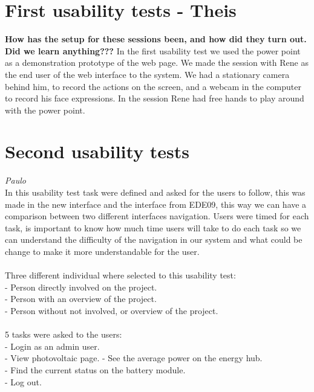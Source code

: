 \section{First usability tests - Theis}
\textbf{How has the setup for these sessions been, and how did they turn out. Did we learn anything???}
In the first usability test we used the power point as a demonstration prototype of the web page. We made the session with Rene as the end user of the web interface to the system. We had a stationary camera behind him, to record the actions on the screen, and a webcam in the computer to record his face expressions. In the session Rene had free hands to play around with the power point.


\section{Second usability tests}
\textit{Paulo}\\
In this usability test task were defined and asked for the users to follow, this was made in the new interface and the interface from EDE09, this way we can have a comparison between two different interfaces navigation. Users were timed for each task, is important to know how much time users will take to do each task so we can understand the difficulty of the navigation in our system and what could be change to make it more understandable for the user.
\\
\\Three different individual where selected to this usability test:\\
- Person directly involved on the project.\\
- Person with an overview of the project.\\
- Person without not involved, or overview of the project.\\
\\
5 tasks were asked to the users:\\
- Login as an admin user.\\
- View photovoltaic page.
- See the average power on the energy hub.\\
- Find the current status on the battery module.\\
- Log out.
\\
















